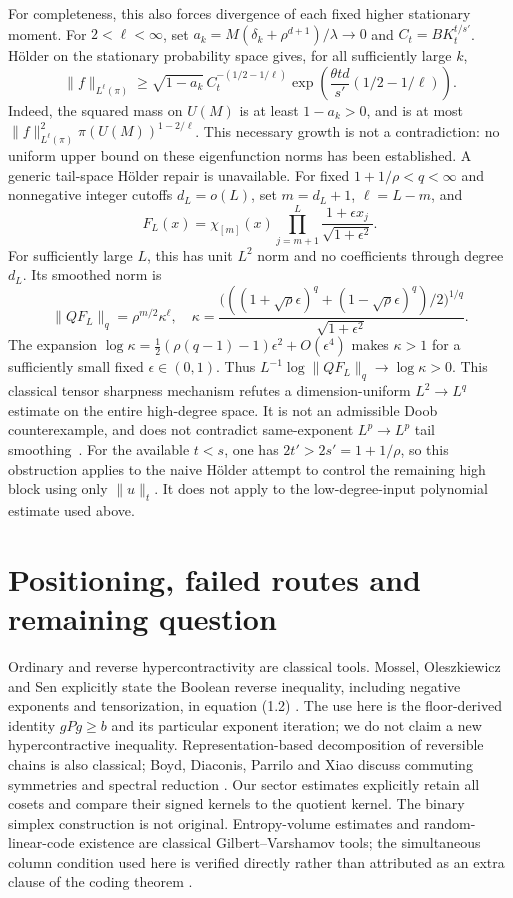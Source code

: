 \documentclass[11pt]{article}
\begin{document}
For completeness, this also forces divergence of each fixed higher
stationary moment. For $2<\ell<\infty$, set
$a_k=M(\delta_k+\rho^{d+1})/\lambda\to0$ and
$C_t=BK_t^{t/s'}$. H\"older on the stationary probability space gives,
for all sufficiently large $k$,
\[
 \|f\|_{L^\ell(\pi)}\ge
 \sqrt{1-a_k}\,C_t^{-(1/2-1/\ell)}
 \exp\!\left(\frac{\theta td}{s'}(1/2-1/\ell)\right).
\]
Indeed, the squared mass on $U(M)$ is at least $1-a_k>0$, and is at
most $\|f\|_{L^\ell(\pi)}^2\pi(U(M))^{1-2/\ell}$.
This necessary growth is not a contradiction: no uniform upper bound
on these eigenfunction norms has been established.
A generic tail-space H\"older repair is unavailable. For fixed
$1+1/\rho<q<\infty$ and nonnegative integer cutoffs $d_L=o(L)$, set $m=d_L+1$, $\ell=L-m$, and
\[
 F_L(x)=\chi_{[m]}(x)\prod_{j=m+1}^{L}
       \frac{1+\epsilon x_j}{\sqrt{1+\epsilon^2}}.
\]
For sufficiently large $L$, this has unit $L^2$ norm and no coefficients
through degree $d_L$. Its smoothed norm is
\[
 \|QF_L\|_q=\rho^{m/2}\kappa^\ell,\quad
 \kappa=\frac{\bigl(((1+\sqrt\rho\epsilon)^q+
 (1-\sqrt\rho\epsilon)^q)/2\bigr)^{1/q}}{\sqrt{1+\epsilon^2}}.
\]
The expansion $\log\kappa=\tfrac12(\rho(q-1)-1)\epsilon^2+
O(\epsilon^4)$ makes $\kappa>1$ for a sufficiently small fixed
$\epsilon\in(0,1)$. Thus $L^{-1}\log\|QF_L\|_q\to\log\kappa>0$.
This classical tensor sharpness mechanism refutes a dimension-uniform
$L^2\to L^q$ estimate on the entire high-degree space. It is not an
admissible Doob counterexample, and does not contradict same-exponent
$L^p\to L^p$ tail smoothing~\cite{hmo,volberg}. For the available $t<s$, one has $2t'>2s'=1+1/\rho$, so this obstruction applies to the naive H\"older attempt to control the remaining high block using only $\|u\|_t$. It does not apply to the low-degree-input polynomial estimate used above.


\section{Positioning, failed routes and remaining question}
Ordinary and reverse hypercontractivity are classical tools. Mossel, Oleszkiewicz and Sen explicitly state the Boolean reverse inequality, including negative exponents and tensorization, in equation (1.2) \cite{mos}. The use here is the floor-derived identity $gPg\geq b$ and its particular exponent iteration; we do not claim a new hypercontractive inequality. Representation-based decomposition of reversible chains is also classical; Boyd, Diaconis, Parrilo and Xiao discuss commuting symmetries and spectral reduction \cite{boyd}. Our sector estimates explicitly retain all cosets and compare their signed kernels to the quotient kernel. The binary simplex construction is not original. Entropy-volume estimates and random-linear-code existence are classical Gilbert--Varshamov tools; the simultaneous column condition used here is verified directly rather than attributed as an extra clause of the coding theorem \cite{guruswami}.
\end{document}
